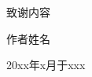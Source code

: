 \newpage
{}
{%
}
{%
    致谢内容

    \begin{flushright}
        \vspace*{\fill}
        作者姓名

        20xx年x月于xxx
    \end{flushright}
}